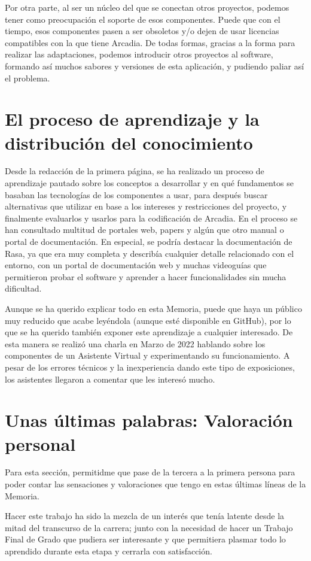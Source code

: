 Por otra parte, al ser un núcleo del que se conectan otros proyectos, podemos tener como preocupación el soporte de esos componentes. Puede que con el tiempo, esos componentes pasen a ser obsoletos y/o dejen de usar licencias compatibles con la que tiene Arcadia. De todas formas, gracias a la forma para realizar las adaptaciones, podemos introducir otros proyectos al software, formando así muchos sabores y versiones de esta aplicación, y pudiendo paliar así el problema.

\section{El proceso de aprendizaje y la distribución del conocimiento}
Desde la redacción de la primera página, se ha realizado un proceso de aprendizaje pautado sobre los conceptos a desarrollar y en qué fundamentos se basaban las tecnologías de los componentes a usar, para después buscar alternativas que utilizar en base a los intereses y restricciones del proyecto, y finalmente evaluarlos y usarlos para la codificación de Arcadia. En el proceso se han consultado multitud de portales web, papers y algún que otro manual o portal de documentación. En especial, se podría destacar la documentación de Rasa, ya que era muy completa y describía cualquier detalle relacionado con el entorno, con un portal de documentación web y muchas videoguías que permitieron probar el software y aprender a hacer funcionalidades sin mucha dificultad.

Aunque se ha querido explicar todo en esta Memoria, puede que haya un público muy reducido que acabe leyéndola (aunque esté disponible en GitHub), por lo que se ha querido también exponer este aprendizaje a cualquier interesado. De esta manera se realizó una charla en Marzo de 2022 hablando sobre los componentes de un Asistente Virtual y experimentando su funcionamiento. A pesar de los errores técnicos y la inexperiencia dando este tipo de exposiciones, los asistentes llegaron a comentar que les interesó mucho.



\section{Unas últimas palabras: Valoración personal}
Para esta sección, permitidme que pase de la tercera a la primera persona para poder contar las sensaciones y valoraciones que tengo en estas últimas líneas de la Memoria.

Hacer este trabajo ha sido la mezcla de un interés que tenía latente desde la mitad del transcurso de la carrera; junto con la necesidad de hacer un Trabajo Final de Grado que pudiera ser interesante y que permitiera plasmar todo lo aprendido durante esta etapa y cerrarla con satisfacción.

